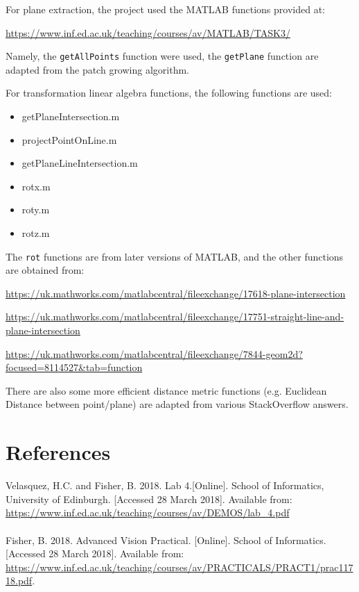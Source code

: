 \documentclass[10pt,a4paper]{article}
\begin{document}
For plane extraction, the project used the MATLAB functions provided at:

\url{https://www.inf.ed.ac.uk/teaching/courses/av/MATLAB/TASK3/}

Namely, the {\tt getAllPoints} function were used, the {\tt getPlane} function are adapted from the patch growing algorithm.

For transformation linear algebra functions, the following functions are used:
\begin{itemize}
\setlength{\parskip}{-2pt}
\item getPlaneIntersection.m 
\item projectPointOnLine.m
\item getPlaneLineIntersection.m
\item rotx.m 
\item roty.m
\item rotz.m
\end{itemize}

The {\tt rot} functions are from later versions of MATLAB, and the other functions are obtained from:

\url{https://uk.mathworks.com/matlabcentral/fileexchange/17618-plane-intersection}

\url{https://uk.mathworks.com/matlabcentral/fileexchange/17751-straight-line-and-plane-intersection}

\url{https://uk.mathworks.com/matlabcentral/fileexchange/7844-geom2d?focused=8114527&tab=function}


There are also some more efficient distance metric functions (e.g. Euclidean Distance between point/plane) are adapted from various StackOverflow answers. 

\section{References}
Velasquez, H.C. and Fisher, B. 2018. Lab 4.[Online]. School of Informatics, University of Edinburgh. [Accessed 28 March 2018]. Available from:
\url{https://www.inf.ed.ac.uk/teaching/courses/av/DEMOS/lab_4.pdf}\\
\\
Fisher, B. 2018. Advanced Vision Practical. [Online]. School of Informatics. [Accessed 28 March 2018]. Available from: \url{https://www.inf.ed.ac.uk/teaching/courses/av/PRACTICALS/PRACT1/prac11718.pdf}. 
\end{document}
